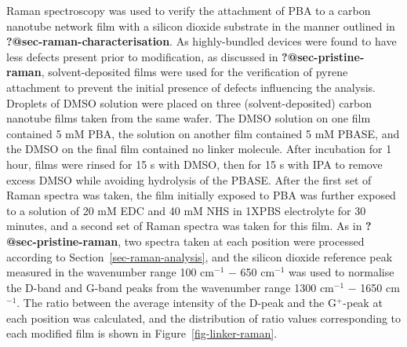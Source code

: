\documentclass[
  a4paper,
]{scrbook}
\begin{document}
Raman spectroscopy was used to verify the attachment of PBA to a carbon
nanotube network film with a silicon dioxide substrate in the manner
outlined in \textbf{?@sec-raman-characterisation}. As highly-bundled
devices were found to have less defects present prior to modification,
as discussed in \textbf{?@sec-pristine-raman}, solvent-deposited films
were used for the verification of pyrene attachment to prevent the
initial presence of defects influencing the analysis. Droplets of DMSO
solution were placed on three (solvent-deposited) carbon nanotube films
taken from the same wafer. The DMSO solution on one film contained 5 mM
PBA, the solution on another film contained 5 mM PBASE, and the DMSO on
the final film contained no linker molecule. After incubation for 1
hour, films were rinsed for 15 s with DMSO, then for 15 s with IPA to
remove excess DMSO while avoiding hydrolysis of the PBASE. After the
first set of Raman spectra was taken, the film initially exposed to PBA
was further exposed to a solution of 20 mM EDC and 40 mM NHS in 1XPBS
electrolyte for 30 minutes, and a second set of Raman spectra was taken
for this film. As in \textbf{?@sec-pristine-raman}, two spectra taken at
each position were processed according to
Section~\ref{sec-raman-analysis}, and the silicon dioxide reference peak
measured in the wavenumber range 100 cm\(^{-1}\) \(-\) 650 cm\(^{-1}\)
was used to normalise the D-band and G-band peaks from the wavenumber
range 1300 cm\(^{-1}\) \(-\) 1650 cm\(^{-1}\). The ratio between the
average intensity of the D-peak and the G\(^+\)-peak at each position
was calculated, and the distribution of ratio values corresponding to
each modified film is shown in Figure~\ref{fig-linker-raman}.
\end{document}
